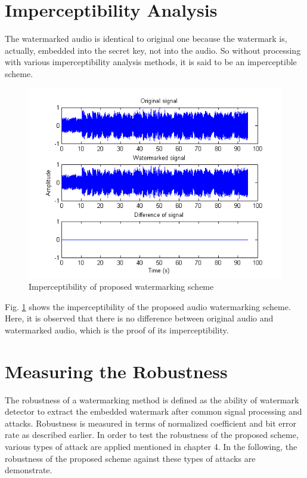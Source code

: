\documentclass[12pt,a4paper]{report}
\begin{document}
\section{Imperceptibility Analysis}

The watermarked audio is identical to original one because the watermark is, actually, embedded into the secret key, not into the audio. So without processing with various imperceptibility analysis methods, it is said to be an imperceptible scheme.

\begin{figure}[h!]
\centering
\includegraphics[scale=.8]{image/imperceptibility.png}
\caption{Imperceptibility of proposed watermarking scheme}
\label{fig:imperceptibility}
\end{figure}

\newpage

Fig. \ref{fig:imperceptibility} shows the imperceptibility of the proposed audio watermarking scheme. Here, it is observed that there is no difference between original audio and watermarked audio, which is the proof of its imperceptibility.

\section{Measuring the Robustness}

The robustness of a watermarking method is defined as the ability of watermark detector to extract the embedded watermark after common signal processing and attacks. Robustness is measured in terms of normalized coefficient and bit error rate as described earlier. In order to test the robustness of the proposed scheme, various types of attack are applied mentioned in chapter 4. In the following, the robustness of the proposed scheme against these types of attacks are demonstrate. 
\end{document}
